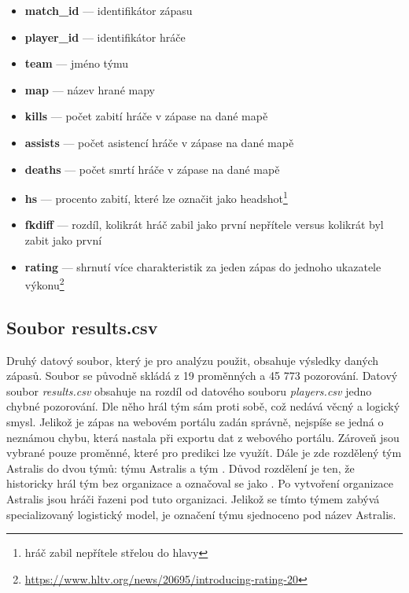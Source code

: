 \begin{itemize}
    \item \textbf{match\_id} --- identifikátor zápasu
    \item \textbf{player\_id} --- identifikátor hráče
    \item \textbf{team} --- jméno týmu
    \item \textbf{map} --- název hrané mapy
    \item \textbf{kills} --- počet zabití hráče v zápase na dané mapě
    \item \textbf{assists} --- počet asistencí hráče v zápase na dané mapě
    \item \textbf{deaths} --- počet smrtí hráče v zápase na dané mapě
    \item \textbf{hs} --- procento zabití, které lze označit jako headshot\footnote{hráč zabil nepřítele střelou do hlavy}
    \item \textbf{fkdiff} --- rozdíl, kolikrát hráč zabil jako první nepřítele versus kolikrát byl zabit jako první
    \item \textbf{rating} --- shrnutí více charakteristik za jeden zápas do jednoho ukazatele výkonu\footnote{\url{https://www.hltv.org/news/20695/introducing-rating-20}}
\end{itemize}

\subsection{Soubor results.csv}
Druhý datový soubor, který je pro analýzu použit, obsahuje výsledky daných zápasů. Soubor se původně skládá z 19 proměnných a 45 773 pozorování. Datový soubor 
\textit{results.csv} obsahuje na rozdíl od datového souboru \textit{players.csv} jedno chybné pozorování. Dle něho hrál tým sám proti sobě, což nedává věcný a logický smysl.
Jelikož je zápas na webovém portálu zadán správně, nejspíše se jedná o neznámou chybu, která nastala při exportu dat z webového portálu. Zároveň jsou vybrané pouze proměnné,
které pro predikci lze využít. Dále je zde rozdělený tým Astralis do dvou týmů: týmu Astralis a tým . Důvod rozdělení je ten, že historicky hrál tým bez organizace a
označoval se jako . Po vytvoření organizace Astralis jsou hráči řazeni pod tuto organizaci. Jelikož se tímto týmem zabývá specializovaný logistický model, je
označení týmu sjednoceno pod název Astralis. 

